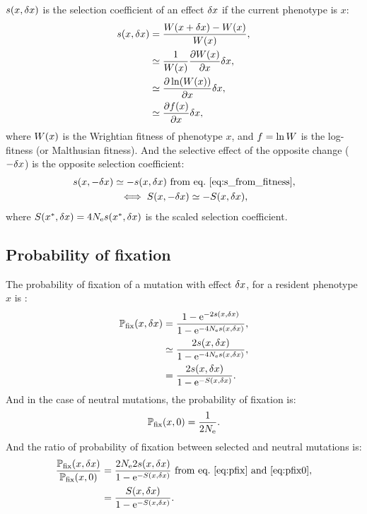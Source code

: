 $s(x, \delta x)$ is the selection coefficient of an effect $\delta x$ if the current phenotype is $x$:
\begin{align}
s(x, \delta x) &= \frac{ W (x + \delta x) - W (x)}{ W ( x)}, \\
 &\simeq \frac{1}{ W (x)}\frac{ \partial W (x) }{\partial x} \delta x, \\
 &\simeq \frac{ \partial \ln (W (x))}{\partial x} \delta x, \\
 &\simeq \frac{ \partial f (x) }{\partial x} \delta x, \label{eq:s_from_fitness}
\end{align}
where $ W ( x)$ is the Wrightian fitness of phenotype $x$, and $ f  = \ln W$ is the log-fitness (or Malthusian fitness).
And the selective effect of the opposite change ($-\delta x$) is the opposite selection coefficient:
\begin{gather}
s(x, -\delta x) \simeq - s(x, \delta x) \text{ from eq.~\ref{eq:s_from_fitness}} \label{eq:s_minus_deltax}, \\
\iff S(x, -\delta x) \simeq - S(x, \delta x), \label{eq:S_minus_deltax}
\end{gather}
where $S(x^{*}, \delta x) = 4N_{\mathrm{e}} s (x^{*}, \delta x)$ is the scaled selection coefficient.

\subsection{Probability of fixation}
\label{subsec:probability-of-fixation}

The probability of fixation of a mutation with effect $\delta x$, for a resident phenotype $x$ is :
\begin{align}
\mathbb{P}_{\mathrm{fix}}(x, \delta x) &= \frac{ 1 - \mathrm{e}^{-2 s(x, \delta x)}}{1 - \mathrm{e}^{-4N_{\mathrm{e}} s(x, \delta x)}}, \\
 &\simeq \frac{ 2 s(x, \delta x)}{1 - \mathrm{e}^{-4N_{\mathrm{e}} s(x, \delta x)}}, \\
 &= \frac{ 2 s(x, \delta x)}{1 - \mathrm{e}^{-S(x, \delta x)}}. \label{eq:pfix}
\end{align}
And in the case of neutral mutations, the probability of fixation is:
\begin{gather}
\mathbb{P}_{\mathrm{fix}}(x, 0) = \frac{ 1}{2 N_{\mathrm{e}}} \label{eq:pfix0}.
\end{gather}
And the ratio of probability of fixation between selected and neutral mutations is:
\begin{align}
\frac{\mathbb{P}_{\mathrm{fix}}(x, \delta x)}{\mathbb{P}_{\mathrm{fix}}(x, 0)} & = \frac{ 2 N_{\mathrm{e}} 2 s(x, \delta x)}{1 - \mathrm{e}^{-S(x, \delta x)}} \text{ from eq.~\ref{eq:pfix} and~\ref{eq:pfix0}},\\
& = \frac{S(x, \delta x)}{1 - \mathrm{e}^{-S(x, \delta x)}} \label{eq:pfixratio}.
\end{align}

